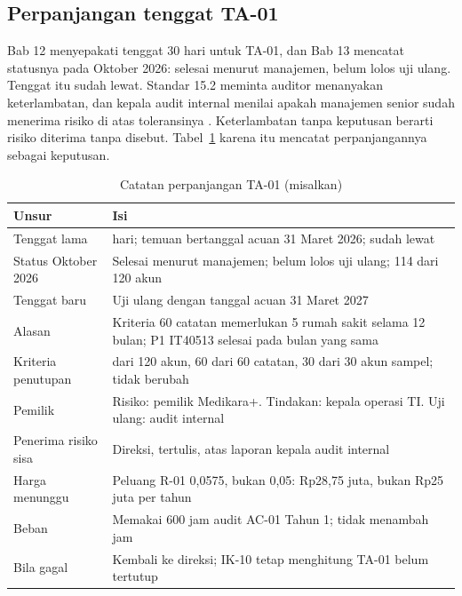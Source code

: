 \subsection*{Perpanjangan tenggat TA-01}

Bab 12 menyepakati tenggat 30 hari untuk TA-01, dan Bab 13 mencatat statusnya pada Oktober 2026:
selesai menurut manajemen, belum lolos uji ulang. Tenggat itu sudah lewat. Standar 15.2 meminta
auditor menanyakan keterlambatan, dan kepala audit internal menilai apakah manajemen senior sudah
menerima risiko di atas toleransinya \cite{iia-gias2024}. Keterlambatan tanpa keputusan berarti
risiko diterima tanpa disebut. Tabel~\ref{tab:ch14-ta01} karena itu mencatat perpanjangannya
sebagai keputusan.

\begin{table}[!htb]
  \centering\small
  \caption{Catatan perpanjangan TA-01 (misalkan)}\label{tab:ch14-ta01}
  \begin{tabularx}{\textwidth}{|>{\raggedright\arraybackslash}p{}|>{\raggedright\arraybackslash}X|}
    \hline
    \textbf{Unsur} & \textbf{Isi} \\ \hline
    Tenggat lama & 30 hari; temuan bertanggal acuan 31 Maret 2026; sudah lewat \\ \hline
    Status Oktober 2026 & Selesai menurut manajemen; belum lolos uji ulang; 114 dari 120 akun \\
    \hline
    Tenggat baru & Uji ulang dengan tanggal acuan 31 Maret 2027 \\ \hline
    Alasan & Kriteria 60 catatan memerlukan 5 rumah sakit selama 12 bulan; P1 IT40513 selesai pada
    bulan yang sama \\ \hline
    Kriteria penutupan & 120 dari 120 akun, 60 dari 60 catatan, 30 dari 30 akun sampel; tidak
    berubah \\ \hline
    Pemilik & Risiko: pemilik Medikara+. Tindakan: kepala operasi TI. Uji ulang: audit internal \\
    \hline
    Penerima risiko sisa & Direksi, tertulis, atas laporan kepala audit internal \\ \hline
    Harga menunggu & Peluang R-01 0,0575, bukan 0,05: Rp28,75 juta, bukan Rp25 juta per tahun \\
    \hline
    Beban & Memakai 600 jam audit AC-01 Tahun 1; tidak menambah jam \\ \hline
    Bila gagal & Kembali ke direksi; IK-10 tetap menghitung TA-01 belum tertutup \\ \hline
  \end{tabularx}
\end{table}

